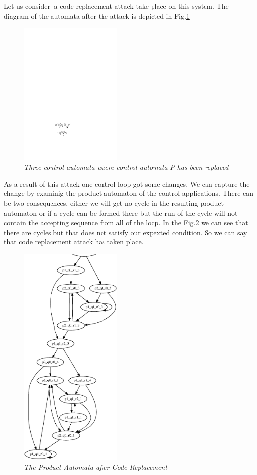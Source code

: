 Let us consider, a code replacement attack take place on this system. The diagram of the
automata after the attack is depicted in Fig.\ref{replaced}
\begin{figure}
\begin{center}
\includegraphics[width= 50mm]{replaced.pdf}
\end{center}
\caption{{\em  Three control automata where control automata $P$ has been replaced}}
\label{replaced}
\end{figure}
As a result of this attack one control loop got some changes. We can capture
the change by examinig the product automaton of the control applications. There can be two 
consequences, either we will get no cycle in the resulting product automaton or if a cycle 
can be formed there but the run of the cycle will not contain the accepting sequence 
from all of the loop. In the Fig.\ref{graph_replaced} we can see that there are cycles but
that does not satisfy our expexted condition. So we can say that code replacement attack has taken place.
\begin{figure}
\begin{center}
\includegraphics[width= 50mm]{graph_replaced.eps}
\end{center}
\caption{{\em The Product Automata after Code Replacement }}
\label{graph_replaced}
\end{figure}